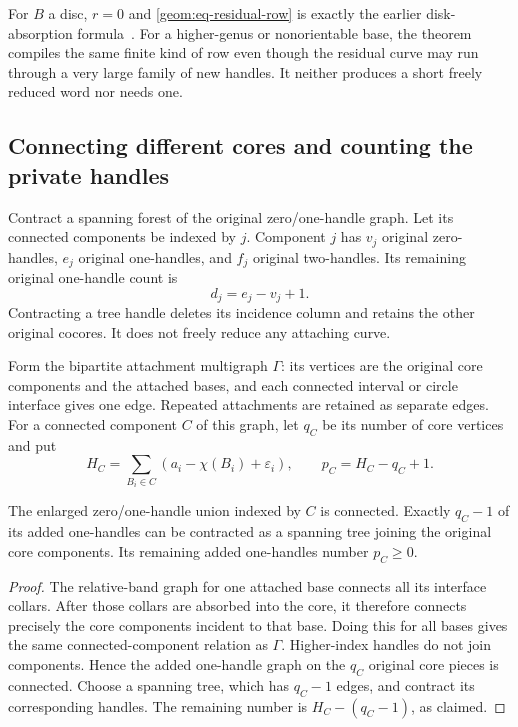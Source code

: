 For $B$ a disc, $r=0$ and
\eqref{geom:eq-residual-row} is exactly the earlier disk-absorption
formula~\cite{marked-parallelity-85}.  For a higher-genus or nonorientable
base, the theorem compiles the same finite kind of row even though
the residual curve may run through a very large family of new handles.
It neither produces a short freely reduced word nor needs one.

\subsection{Connecting different cores and counting the private handles}
\label{geom:connectors}

Contract a spanning forest of the original zero/one-handle graph.
Let its connected components be indexed by $j$.  Component $j$ has
$v_j$ original zero-handles, $e_j$ original one-handles, and $f_j$
original two-handles.  Its remaining original one-handle count is
\[
 d_j=e_j-v_j+1.
\]
Contracting a tree handle deletes its incidence column and retains the
other original cocores.  It does not freely reduce any attaching curve.

Form the bipartite attachment multigraph $\Gamma$: its vertices are
the original core components and the attached bases, and each connected
interval or circle interface gives one edge.  Repeated attachments are
retained as separate edges.  For a connected component $C$ of this
graph, let $q_C$ be its number of core vertices and put
\begin{equation}
 H_C=\sum_{B_i\in C}(a_i-\chi(B_i)+\varepsilon_i),
 \qquad
 p_C=H_C-q_C+1.
 \label{geom:eq-private-count}
\end{equation}

\begin{lemma}
\label{geom:lem-connector-forest}
The enlarged zero/one-handle union indexed by $C$ is connected.
Exactly $q_C-1$ of its added one-handles can be contracted as a
spanning tree joining the original core components.  Its remaining
added one-handles number $p_C\geq0$.
\end{lemma}

\begin{proof}
The relative-band graph for one attached base connects all its
interface collars.  After those collars are absorbed into the core,
it therefore connects precisely the core components incident to that
base.  Doing this for all bases gives the same connected-component
relation as $\Gamma$.  Higher-index handles do not join components.
Hence the added one-handle graph on the $q_C$ original core pieces is
connected.  Choose a spanning tree, which has $q_C-1$ edges, and
contract its corresponding handles.  The remaining number is
$H_C-(q_C-1)$, as claimed.
\end{proof}


